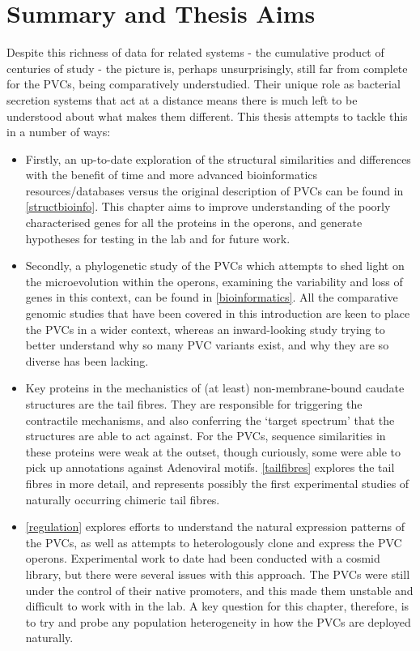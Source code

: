 \section{Summary and Thesis Aims}
Despite this richness of data for related systems - the cumulative product of centuries of study - the picture is, perhaps unsurprisingly, still far from complete for the PVCs, being comparatively understudied. Their unique role as bacterial secretion systems that act at a distance means there is much left to be understood about what makes them different. This thesis attempts to tackle this in a number of ways:

\begin{itemize}
\item Firstly, an up-to-date exploration of the structural similarities and differences with the benefit of time and more advanced bioinformatics resources/databases versus the original description of PVCs can be found in \vref{structbioinfo}. This chapter aims to improve understanding of the poorly characterised genes for all the proteins in the operons, and generate hypotheses for testing in the lab and for future work.

\item Secondly, a phylogenetic study of the PVCs which attempts to shed light on the microevolution within the operons, examining the variability and loss of genes in this context, can be found in \vref{bioinformatics}. All the comparative genomic studies that have been covered in this introduction are keen to place the PVCs in a wider context, whereas an inward-looking study trying to better understand why so many PVC variants exist, and why they are so diverse has been lacking. 

\item Key proteins in the mechanistics of (at least) non-membrane-bound caudate structures are the tail fibres. They are responsible for triggering the contractile mechanisms, and also conferring the `target spectrum' that the structures are able to act against. For the PVCs, sequence similarities in these proteins were weak at the outset, though curiously, some were able to pick up annotations against Adenoviral motifs. \vref{tailfibres} explores the tail fibres in more detail, and represents possibly the first experimental studies of naturally occurring chimeric tail fibres.

\item \vref{regulation} explores efforts to understand the natural expression patterns of the PVCs, as well as attempts to heterologously clone and express the PVC operons. Experimental work to date had been conducted with a cosmid library, but there were several issues with this approach. The PVCs were still under the control of their native promoters, and this made them unstable and difficult to work with in the lab. A key question for this chapter, therefore, is to try and probe any population heterogeneity in how the PVCs are deployed naturally.

\end{itemize}


